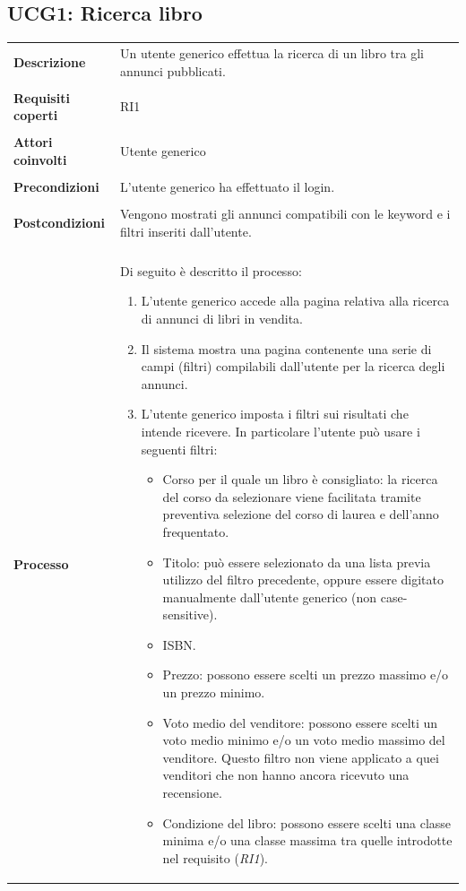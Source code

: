 \documentclass[10pt,a4paper]{report}
\begin{document}
	\subsection{UCG1: Ricerca libro}
	\begin{tabular}{lp{}}
		\textbf{Descrizione}&Un utente generico effettua la ricerca di un libro tra gli annunci pubblicati.\\
		\\
		\textbf{Requisiti coperti}&RI1\\
		\\
		\textbf{Attori coinvolti}&Utente generico\\
		\\
		\textbf{Precondizioni}&L'utente generico ha effettuato il login.\\
		\\
		\textbf{Postcondizioni}&Vengono mostrati gli annunci compatibili con le keyword e i filtri inseriti dall'utente.\\
		\\
		\textbf{Processo}&Di seguito è descritto il processo:
		\begin{enumerate}
			\item L'utente generico accede alla pagina relativa alla ricerca di annunci di libri in vendita.
			\item Il sistema mostra una pagina contenente una serie di campi (filtri) compilabili dall'utente per la ricerca degli annunci.
			\item L'utente generico imposta i filtri sui risultati che intende ricevere. In particolare l'utente può usare i seguenti filtri:
			\begin{itemize}
				\item Corso per il quale un libro è consigliato: la ricerca del corso da selezionare viene facilitata tramite preventiva selezione del corso di laurea e dell'anno frequentato.
				\item Titolo: può essere selezionato da una lista previa utilizzo del filtro precedente, oppure essere digitato manualmente dall'utente generico (non case-sensitive).
				\item ISBN.
				\item Prezzo: possono essere scelti un prezzo massimo e/o un prezzo minimo.
				\item Voto medio del venditore: possono essere scelti un voto medio minimo e/o un voto medio massimo del venditore. Questo filtro non viene applicato a quei venditori che non hanno ancora ricevuto una recensione.
				\item Condizione del libro: possono essere scelti una classe minima e/o una classe massima tra quelle introdotte nel requisito (\textit{RI1}).			

\end{itemize}
\end{enumerate}
\end{tabular}
\end{document}
